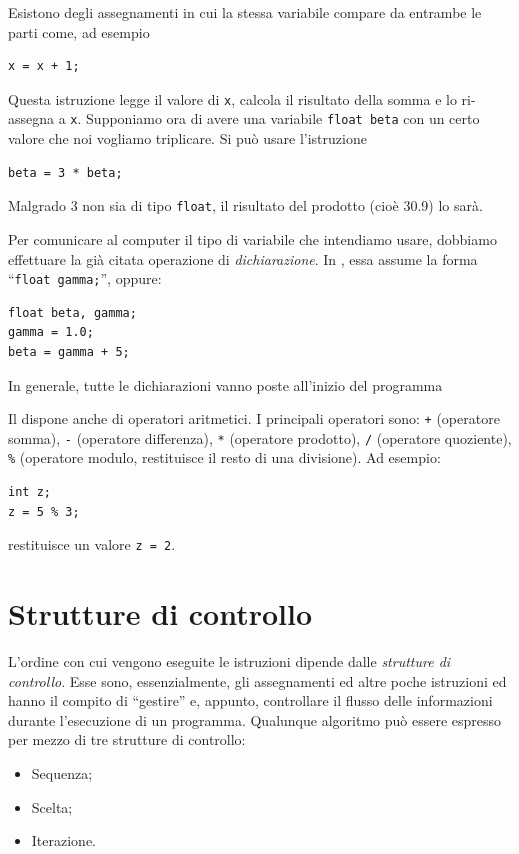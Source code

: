 Esistono degli assegnamenti in cui la stessa variabile compare da entrambe le parti come, ad esempio
\begin{lstlisting}
x = x + 1;
\end{lstlisting}
Questa istruzione legge il valore di \lstinline!x!, calcola il risultato della somma e lo ri-assegna a \lstinline!x!.
Supponiamo ora di avere una variabile \lstinline!float beta! con un certo valore che noi vogliamo triplicare.
Si può usare l'istruzione
\begin{lstlisting}
beta = 3 * beta;
\end{lstlisting}
Malgrado \num{3} non sia di tipo \lstinline!float!, il risultato del prodotto (cioè \num{30.9}) lo sarà.


Per  comunicare al computer il tipo di variabile che intendiamo usare, dobbiamo effettuare la già citata operazione di \emph{dichiarazione}.
In , essa assume la forma ``\lstinline!float gamma;!'', oppure:
\begin{lstlisting}
float beta, gamma;
gamma = 1.0;
beta = gamma + 5;
\end{lstlisting}
In generale, tutte le dichiarazioni vanno poste all'inizio del programma

Il  dispone anche di operatori aritmetici. I  principali operatori sono: \lstinline!+! (operatore somma), \lstinline!-! (operatore differenza), \lstinline!*! (operatore prodotto), \lstinline!/! (operatore quoziente), \lstinline!%! (operatore modulo, restituisce il resto di una divisione). Ad esempio:
\begin{lstlisting}
int z;
z = 5 % 3;
\end{lstlisting}
restituisce un valore \lstinline!z = 2!.

	\section{Strutture di controllo}
	\label{sec:ContStruc}
L'ordine con cui vengono eseguite le istruzioni dipende dalle \emph{strutture di controllo}.
Esse sono, essenzialmente, gli assegnamenti ed altre poche istruzioni ed hanno il compito di ``gestire'' e, appunto, controllare il flusso delle informazioni durante l'esecuzione di un programma.
Qualunque algoritmo può essere espresso per mezzo di tre strutture di controllo:
\begin{itemize}
	\item
Sequenza;
	\item
Scelta;
	\item
Iterazione.
\end{itemize}

